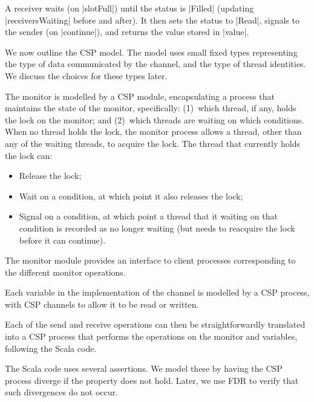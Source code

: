 A receiver waits (on |slotFull|) until the status is |Filled| (updating
|receiversWaiting| before and after).  It then sets the status to |Read|,
signals to the sender (on |continue|), and returns the value stored in
|value|.

We now outline the CSP model.  The model uses small fixed types representing
the type of data communicated by the channel, and the type of thread
identities.  We discuss the choices for these types later. 

The monitor is modelled by a CSP module, encapsulating a process that
maintains the state of the monitor, specifically: (1)~which thread, if any,
holds the lock on the monitor; and (2)~which threads are waiting on which
conditions.  When no thread holds the lock, the monitor process allows a
thread, other than any of the waiting threads, to acquire the lock.  The
thread that currently holds the lock can:
\begin{itemize}
\item Release the lock;
\item Wait on a condition, at which point it also releases the lock;
\item Signal on a condition, at which point a thread that it waiting on that
  condition is recorded as no longer waiting (but needs to reacquire the lock
  before it can continue).
\end{itemize}
%
The monitor module provides an interface to client processes corresponding to
the different monitor operations.

Each variable in the implementation of the channel is modelled by a CSP
process, with CSP channels to allow it to be read or written.

Each of the send and receive operations can then be straightforwardly
translated into a CSP process that performs the operations on the monitor and
variables, following the Scala code.  

The Scala code uses several assertions.  We model these by having the CSP
process diverge if the property does not hold.  Later, we use FDR to verify
that such divergences do not occur.  

